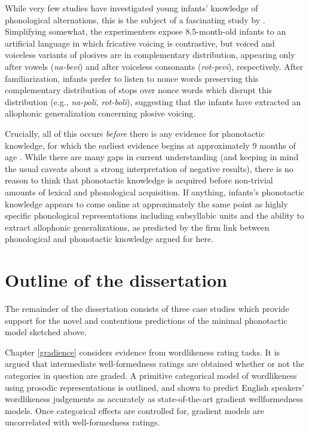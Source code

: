 While very few studies have investigated young infants' knowledge of phonological alternations, this is the subject of a fascinating study by \citet{White2008}.
Simplifying somewhat, the experimenters expose 8.5-month-old infants to an artificial language in which fricative voicing is contrastive, but voiced and voiceless variants of plosives are in complementary distribution, appearing only after vowels (\emph{na-bevi}) and after voiceless consonants (\emph{rot-pevi}), respectively.
After familiarization, infants prefer to listen to nonce words preserving this complementary distribution of stops over nonce words which disrupt this distribution (e.g., \emph{na-poli}, \emph{rot-boli}), suggesting that the infants have extracted an allophonic generalization concerning plosive voicing.

Crucially, all of this occurs \emph{before} there is any evidence for phonotactic knowledge, for which the earliest evidence begins at approximately 9 months of age \citep{Friederici1993,Jusczyk1993b,Jusczyk1994}.
While there are many gaps in current understanding (and keeping in mind the usual caveats about a strong interpretation of negative results), there is no reason to think that phonotactic knowledge is acquired before non-trivial amounts of lexical and phonological acquisition.
If anything, infants's phonotactic knowledge appears to come online at approximately the same point as highly specific phonological representations including subsyllabic units and the ability to extract allophonic generalizations, as predicted by the firm link between phonological and phonotactic knowledge argued for here.

\section{Outline of the dissertation}

The remainder of the dissertation consists of three case studies which provide support for the novel and contentious predictions of the minimal phonotactic model sketched above.

Chapter \ref{gradience} considers evidence from wordlikeness rating tasks. It is argued that intermediate well-formedness ratings are obtained whether or not the categories in question are graded. A primitive categorical model of wordlikeness using prosodic representations is outlined, and shown to predict English speakers' wordlikeness judgements as accurately as state-of-the-art gradient wellformedness models. Once categorical effects are controlled for, gradient models are uncorrelated with well-formedness ratings.

